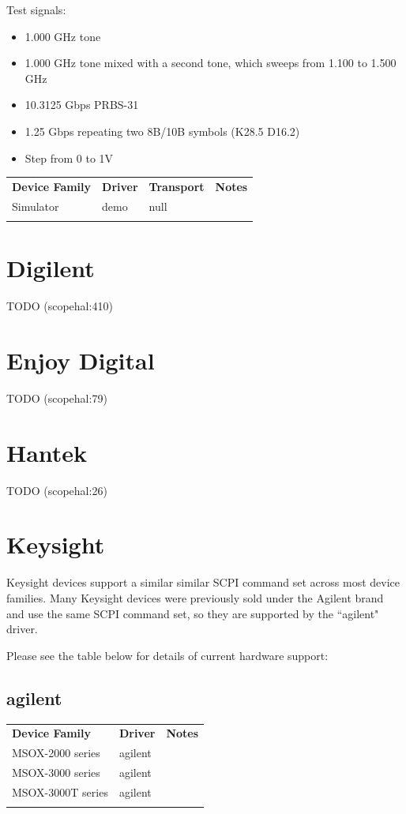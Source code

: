 Test signals:
\begin{itemize}
\item 1.000 GHz tone
\item 1.000 GHz tone mixed with a second tone, which sweeps from 1.100 to 1.500 GHz
\item 10.3125 Gbps PRBS-31
\item 1.25 Gbps repeating two 8B/10B symbols (K28.5 D16.2)
\item Step from 0 to 1V
\end{itemize}

\begin{tabularx}{16cm}{lllX}
\thickhline
\textbf{Device Family} & \textbf{Driver} & \textbf{Transport} & \textbf{Notes} \\
\thickhline
Simulator & demo & null & \\
\thickhline
\end{tabularx}

\section{Digilent}
TODO (scopehal:410)

\section{Enjoy Digital}
TODO (scopehal:79)

\section{Hantek}
TODO (scopehal:26)

\section{Keysight}

Keysight devices support a similar similar SCPI command set across most device families. Many Keysight devices were
previously sold under the Agilent brand and use the same SCPI command set, so they are supported by the ``agilent"
driver.

Please see the table below for details of current hardware support:

\subsection{agilent}

\begin{tabularx}{16cm}{llX}
\thickhline
\textbf{Device Family} & \textbf{Driver} & \textbf{Notes} \\
\thickhline
MSOX-2000 series & agilent &  \\
\thickhline
MSOX-3000 series & agilent &  \\
\thickhline
MSOX-3000T series & agilent &  \\
\thickhline
\end{tabularx}

